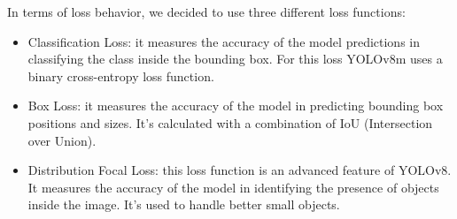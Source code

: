 In terms of loss behavior, we decided to use three different loss functions:
\begin{itemize}
    \item Classification Loss: it measures the accuracy of the model predictions in classifying the class inside the bounding box.
    For this loss YOLOv8m uses a binary cross-entropy loss function.
    \item Box Loss: it measures the accuracy of the model in predicting bounding box positions and sizes. It's calculated with a combination of IoU (Intersection over Union).
    \item Distribution Focal Loss: this loss function is an advanced feature of YOLOv8. It measures the accuracy of the model in identifying the presence of objects inside the image. It's used to handle better small objects.
\end{itemize}

\begin{table}[ht]
\centering
\caption{Final validation loss values for the merged dataset. All values are approximate and taken at convergence}
\label{tab:yolov8-loss:final}
\end{table}

